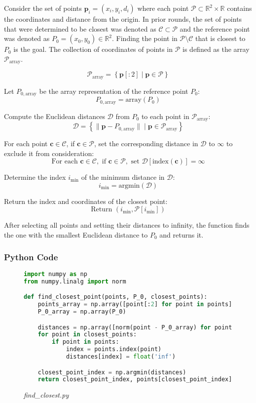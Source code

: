 \documentclass[12pt,a4paper]{report}
\begin{document}
Consider the set of points \( \mathbf{p}_i = (x_i, y_i, d_i) \) where each point \( \mathcal{P} \subset \mathbb{R}^2 \times \mathbb{R} \) contains the coordinates and distance from the origin. In prior rounds, the set of points that were determined to be closest was denoted as \( \mathcal{C} \subset \mathcal{P} \) and the reference point was denoted as \( P_0 = (x_0, y_0) \in \mathbb{R}^2 \). Finding the point in \( \mathcal{P} \setminus \mathcal{C} \) that is closest to \( P_0 \) is the goal. The collection of coordinates of points in \( \mathcal{P} \) is defined as the array \( \mathcal{P}_{\text{array}} \).

\[
\mathcal{P}_{\text{array}} = \left\{ \mathbf{p}[:2] \mid \mathbf{p} \in \mathcal{P} \right\}
\]

Let \( P_{0,\text{array}} \) be the array representation of the reference point \( P_0 \):
\[
P_{0,\text{array}} = \text{array}(P_0)
\]

Compute the Euclidean distances \( \mathcal{D} \) from \( P_0 \) to each point in \( \mathcal{P}_{\text{array}} \):
\[
\mathcal{D} = \left\{ \|\mathbf{p} - P_{0,\text{array}}\| \mid \mathbf{p} \in \mathcal{P}_{\text{array}} \right\}
\]

For each point \( \mathbf{c} \in \mathcal{C} \), if \( \mathbf{c} \in \mathcal{P} \), set the corresponding distance in \( \mathcal{D} \) to \( \infty \) to exclude it from consideration:
\[
\text{For each } \mathbf{c} \in \mathcal{C}, \text{ if } \mathbf{c} \in \mathcal{P}, \text{ set } \mathcal{D}[\text{index}(\mathbf{c})] = \infty
\]

Determine the index \( i_{\text{min}} \) of the minimum distance in \( \mathcal{D} \):
\[
i_{\text{min}} = \text{argmin}(\mathcal{D})
\]

Return the index and coordinates of the closest point:
\[
\text{Return } (i_{\text{min}}, \mathcal{P}[i_{\text{min}}])
\]


After selecting all points and setting their distances to infinity, the function finds the one with the smallest Euclidean distance to \( P_0 \) and returns it.

\subsubsection{Python Code}
\begin{figure}[H]
\centering
\caption*{\large\textit{find\_closest.py}}
\begin{lstlisting}[language=Python, caption={Function to Find Closest Point}]
import numpy as np
from numpy.linalg import norm

def find_closest_point(points, P_0, closest_points):
    points_array = np.array([point[:2] for point in points])
    P_0_array = np.array(P_0)

    distances = np.array([norm(point - P_0_array) for point in points_array])
    for point in closest_points:
        if point in points:
            index = points.index(point)
            distances[index] = float('inf')

    closest_point_index = np.argmin(distances)
    return closest_point_index, points[closest_point_index]
\end{lstlisting}
\end{figure}
\end{document}
